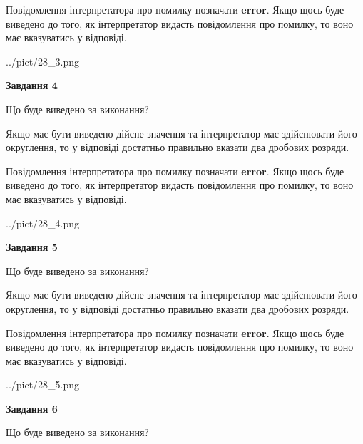 \documentclass[12pt, ukrainian]{article}
\begin{document}
{\begin {Large}
Повідомлення інтерпретатора про помилку позначати \textbf{error}.
Якщо щось буде виведено до того, як інтерпретатор видасть повідомлення про помилку, 
то воно має вказуватись у відповіді. \par

\begin{center}
	{../pict/28_3.png}
\end{center}
\newpage

{\begin {center}\textbf{Завдання 4}\end {center}}\par
Що буде виведено за виконання? \par

Якщо має бути виведено дійсне значення та інтерпретатор має здійснювати його округлення, 
то у відповіді достатньо правильно вказати два дробових розряди.

Повідомлення інтерпретатора про помилку позначати \textbf{error}.
Якщо щось буде виведено до того, як інтерпретатор видасть повідомлення про помилку, 
то воно має вказуватись у відповіді. \par

\begin{center}
	{../pict/28_4.png}
\end{center}
\newpage

{\begin {center}\textbf{Завдання 5}\end {center}}\par
Що буде виведено за виконання? \par

Якщо має бути виведено дійсне значення та інтерпретатор має здійснювати його округлення, 
то у відповіді достатньо правильно вказати два дробових розряди.

Повідомлення інтерпретатора про помилку позначати \textbf{error}.
Якщо щось буде виведено до того, як інтерпретатор видасть повідомлення про помилку, 
то воно має вказуватись у відповіді. \par

\begin{center}
	{../pict/28_5.png}
\end{center}
\newpage

{\begin {center}\textbf{Завдання 6}\end {center}}\par
Що буде виведено за виконання? \par


\end{Large}}
\end{document}
